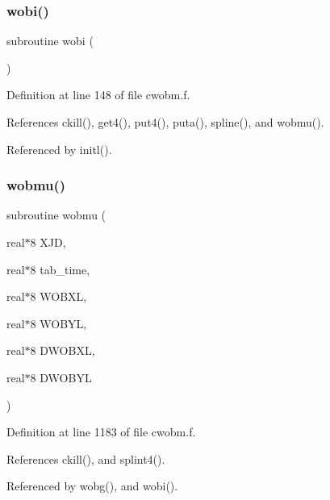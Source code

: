 \subsubsection{\texorpdfstring{wobi()}{wobi()}}
{\footnotesize\ttfamily subroutine wobi (\begin{DoxyParamCaption}{ }\end{DoxyParamCaption})}



Definition at line 148 of file cwobm.\+f.



References ckill(), get4(), put4(), puta(), spline(), and wobmu().



Referenced by initl().

\mbox{\label{cwobm_8f_a310295a03dba5cfe2a39af134f165466}} 
\subsubsection{\texorpdfstring{wobmu()}{wobmu()}}
{\footnotesize\ttfamily subroutine wobmu (\begin{DoxyParamCaption}\item[{real$\ast$8}]{X\+JD,  }\item[{real$\ast$8}]{tab\+\_\+time,  }\item[{real$\ast$8}]{W\+O\+B\+XL,  }\item[{real$\ast$8}]{W\+O\+B\+YL,  }\item[{real$\ast$8}]{D\+W\+O\+B\+XL,  }\item[{real$\ast$8}]{D\+W\+O\+B\+YL }\end{DoxyParamCaption})}



Definition at line 1183 of file cwobm.\+f.



References ckill(), and splint4().



Referenced by wobg(), and wobi().

\mbox{\label{cwobm_8f_ae034435772bd0a7b80581f40da45021e}} 
